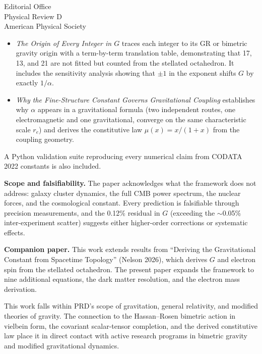 \documentclass[11pt]{letter}
\begin{document}
\begin{letter}{Editorial Office\\Physical Review D\\American Physical Society}
\begin{itemize}
\item \textit{The Origin of Every Integer in $G$} traces each integer to its GR or bimetric gravity origin with a term-by-term translation table, demonstrating that 17, 13, and 21 are not fitted but counted from the stellated octahedron.
It includes the sensitivity analysis showing that $\pm 1$ in the exponent shifts $G$ by exactly $1/\alpha$.

\item \textit{Why the Fine-Structure Constant Governs Gravitational Coupling} establishes why $\alpha$ appears in a gravitational formula (two independent routes, one electromagnetic and one gravitational, converge on the same characteristic scale $r_e$) and derives the constitutive law $\mu(x) = x/(1+x)$ from the coupling geometry.
\end{itemize}
%
A Python validation suite reproducing every numerical claim from CODATA 2022 constants is also included.


\textbf{Scope and falsifiability.}\quad
The paper acknowledges what the framework does not address: galaxy cluster dynamics, the full CMB power spectrum, the nuclear forces, and the cosmological constant.
Every prediction is falsifiable through precision measurements, and the 0.12\% residual in $G$ (exceeding the $\sim$0.05\% inter-experiment scatter) suggests either higher-order corrections or systematic effects.


\textbf{Companion paper.}\quad
This work extends results from ``Deriving the Gravitational Constant from Spacetime Topology'' (Nelson 2026), which derives $G$ and electron spin from the stellated octahedron.
The present paper expands the framework to nine additional equations, the dark matter resolution, and the electron mass derivation.


This work falls within PRD's scope of gravitation, general relativity, and modified theories of gravity.
The connection to the Hassan--Rosen bimetric action in vielbein form, the covariant scalar-tensor completion, and the derived constitutive law place it in direct contact with active research programs in bimetric gravity and modified gravitational dynamics.


\end{letter}
\end{document}
